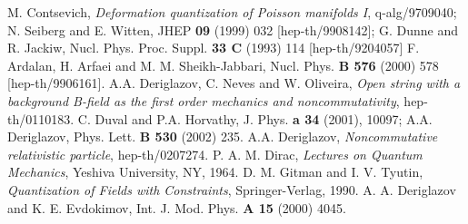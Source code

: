 \documentclass[paper a4]{article}
\begin{document}
\begin{thebibliography}{nn}
\bibitem{} M. Contsevich, {\em Deformation quantization of Poisson
manifolds I}, q-alg/9709040;
\bibitem{} N. Seiberg and E. Witten,
JHEP {\bf 09} (1999) 032 [hep-th/9908142];
\bibitem{} G. Dunne and R. Jackiw, Nucl. Phys. Proc. Suppl.
{\bf 33 C} (1993) 114 [hep-th/9204057]
\bibitem{} F. Ardalan, H. Arfaei and M. M. Sheikh-Jabbari,
Nucl. Phys. {\bf B 576} (2000) 578 [hep-th/9906161].
\bibitem{} A.A. Deriglazov, C. Neves and W. Oliveira, {\em Open string
with a background B-field as the first order mechanics and
noncommutativity}, hep-th/0110183.
\bibitem{} C. Duval and P.A. Horvathy, J. Phys. {\bf a 34} (2001),
10097;
\bibitem{} A.A. Deriglazov, Phys. Lett. {\bf B 530} (2002) 235.
\bibitem{} A.A. Deriglazov, {\em Noncommutative relativistic particle},
hep-th/0207274.
\bibitem{} P. A. M. Dirac, {\em Lectures on Quantum Mechanics},
Yeshiva University, NY, 1964.
\bibitem{} D. M. Gitman and I. V. Tyutin, {\em Quantization of Fields
with Constraints}, Springer-Verlag, 1990.
\bibitem{} A. A. Deriglazov and K. E. Evdokimov, Int. J. Mod. Phys.
{\bf A 15} (2000) 4045.
\end{thebibliography}
\end{document}
